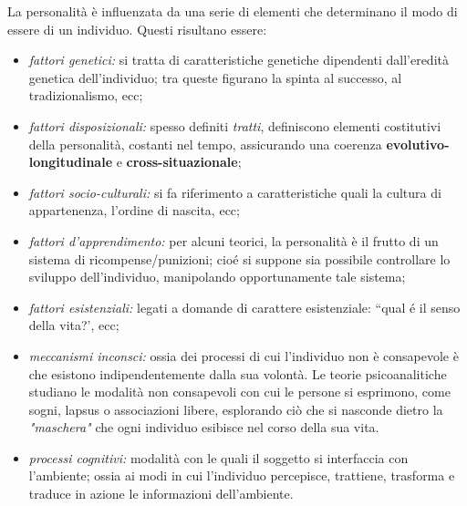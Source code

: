 \documentclass{subfiles}
\begin{document}
La personalità è influenzata da una serie di elementi che determinano il modo di essere di un individuo.
Questi risultano essere:
\begin{itemize}
    \item \emph{fattori genetici:} si tratta di caratteristiche genetiche dipendenti dall'eredità genetica dell'individuo;
          tra queste figurano la spinta al successo, al tradizionalismo, ecc;

    \item \emph{fattori disposizionali:} spesso definiti \emph{tratti}, definiscono elementi costitutivi della personalità, costanti nel tempo,
          assicurando una coerenza \textbf{evolutivo-longitudinale} e \textbf{cross-situazionale};

    \item \emph{fattori socio-culturali:} si fa riferimento a caratteristiche quali la cultura di appartenenza, l'ordine di nascita, ecc;

    \item \emph{fattori d'apprendimento:} per alcuni teorici, la personalità è il frutto di un sistema di ricompense/punizioni;
          cioé si suppone sia possibile controllare lo sviluppo dell'individuo, manipolando opportunamente tale sistema;

    \item \emph{fattori esistenziali:} legati a domande di carattere esistenziale: ``qual é il senso della vita?', ecc;

    \item \emph{meccanismi inconsci:} ossia dei processi di cui l'individuo non è consapevole è che esistono indipendentemente dalla sua volontà.
          Le teorie psicoanalitiche studiano le modalità non consapevoli con cui le persone si esprimono, come sogni, lapsus o associazioni libere,
          esplorando ciò che si nasconde dietro la \textit{"maschera"} che ogni individuo esibisce nel corso della sua vita.

    \item \emph{processi cognitivi:} modalità con le quali il soggetto si interfaccia con l'ambiente; ossia ai modi in cui  l'individuo percepisce, trattiene,
          trasforma e traduce in azione le informazioni dell'ambiente.
\end{itemize}
\end{document}
